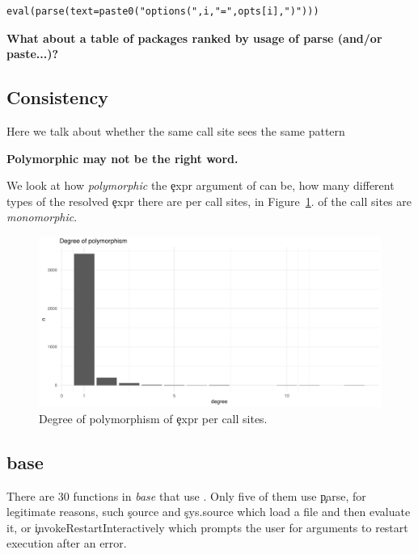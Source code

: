 \documentclass[conference]{IEEEtran}
\begin{document}
\begin{lstlisting}[caption={Using \c{eval} and \c{parse} to do meta-programming in package \emph{data.table}, to build the options at load time (in \emph{onLoad.R}).}, label=code:parsepaste]
eval(parse(text=paste0("options(",i,"=",opts[i],")")))
\end{lstlisting}

\textbf{What about a table of packages ranked by usage of parse (and/or paste...)?}


\subsection{Consistency}

Here we talk about whether the same call site sees the same pattern

{\bf Polymorphic may not be the right word.}

We look at how \emph{polymorphic} the \c{expr} argument of \eval can be, \ie
how many different types of the resolved \c{expr} there are per call sites,
in Figure~\ref{fig:polymorphism}. \PercentMonomorphic of the call sites are
\emph{monomorphic}.

\begin{figure}[!h]
    \includegraphics[width=\columnwidth]{polymorphism}
    \caption{Degree of polymorphism of \c{expr} per call sites.} \label{fig:polymorphism}
\end{figure}

\subsection{base}

There are 30 functions in \emph{base} that use \eval. Only five of them use \c{parse}, for legitimate reasons, such \c{source} and \c{sys.source} which load a file and then evaluate it, or \c{invokeRestartInteractively} which prompts the user for arguments to restart execution after an error.
\end{document}
